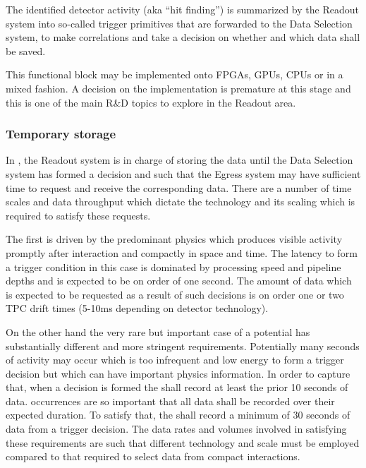 The identified detector activity (aka ``hit finding'') is summarized by the Readout system into so-called trigger primitives that are forwarded to the Data Selection system, to make correlations and take a decision on whether and which data shall be saved.

This functional block may be implemented onto FPGAs, GPUs, CPUs or in a mixed fashion. A decision on the implementation is premature at this stage and this is one of the main R\&D topics to explore in the Readout area.

\subsubsection{Temporary storage}

In , the Readout system is in charge of storing the data until the Data Selection system has formed a decision and such that the Egress system may have sufficient time to request and receive the corresponding data.
There are a number of time scales and data throughput which dictate the technology and its scaling which is required to satisfy these requests.

The first is driven by the predominant physics which produces visible activity promptly after interaction and compactly in space and time. 
The latency to form a trigger condition in this case is dominated by processing speed and pipeline depths and is expected to be on order of one second.  The amount of data which is expected to be requested as a result of such decisions is on order one or two TPC drift times (5-10\si{\milli\second} depending on detector technology).

On the other hand the very rare but important case of a potential  has substantially different and more stringent requirements. 
Potentially many seconds of activity may occur which is too infrequent and low energy to form a trigger decision but which can have important physics information. 
In order to capture that, when a  decision is formed the  shall record at least the prior 10 seconds of data. 
 occurrences are so important that all data shall be recorded over their expected duration. 
To satisfy that, the  shall record a minimum of 30 seconds of data from a  trigger decision. 
The data rates and volumes involved in satisfying these requirements are such that different technology and scale must be employed compared to that required to select data from compact interactions.

